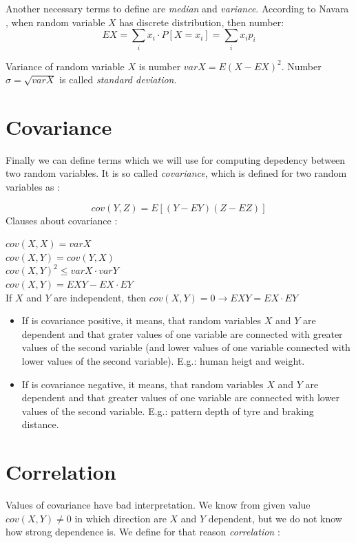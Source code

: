 \documentclass[11pt,twoside,a4paper]{book}
\begin{document}
Another necessary terms to define are \textit{median} and \textit{variance}.
According to Navara \cite{navara:mvt}, when random variable $X$ has discrete distribution, then
number:
$$EX=\sum_i x_i\cdot P\left[X=x_i\right]=\sum_i x_i p_i$$

Variance of random variable $X$ is number $var X = E(X-EX)^2$. Number $\sigma =
\sqrt{var X}$ is called \textit{standard deviation}.

\section{Covariance}
Finally we can define terms which we will use for computing depedency between
two random variables. It is so called \textit{covariance}, which is defined for two
random variables as \cite{navara:mvt}:

$$cov(Y,Z)=E\left[\left(Y-EY\right)\left(Z-EZ\right)\right]$$
Clauses about covariance \cite{kulich:stat}:

\begin{center}
$cov(X,X)=var X$\\
$cov(X,Y)=cov(Y,X)$\\
$cov(X,Y)^2\leq var X \cdot var Y$\\
$cov(X,Y) = EXY - EX\cdot EY$\\
If $X$ and $Y$ are independent, then
$cov\left(X,Y\right)=0 \rightarrow EXY=EX\cdot EY$\\
\end{center}
\begin{itemize}
  \item If is covariance positive, it means, that random variables $X$ and
$Y$ are dependent and that grater values of one variable are connected with
greater values of the second variable (and lower values of one variable connected with
lower values of the second variable). E.g.: human heigt and weight.
  \item If is covariance negative, it means, that random variables $X$ and
$Y$ are dependent and that greater values of one variable are connected with
lower values of the second variable. E.g.: pattern depth
of tyre and braking distance.
\end{itemize}
\section{Correlation}

Values of covariance have bad interpretation. We know from given value
$cov(X,Y)\neq0$ in which direction are $X$ and $Y$ dependent, but we do not know
how strong dependence is. We define for that reason \textit{correlation}
\cite{kulich:stat}:
\end{document}

